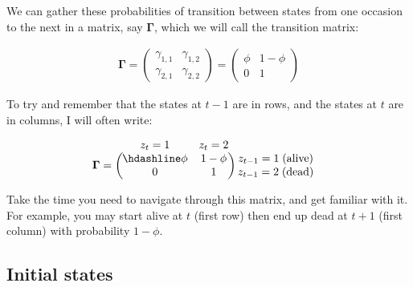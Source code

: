 \documentclass[
  12pt,
]{krantz}
\begin{document}
We can gather these probabilities of transition between states from one occasion to the next in a matrix, say \(\mathbf{\Gamma}\), which we will call the transition matrix:

\begin{align*}
\mathbf{\Gamma} =
\left(\begin{array}{cc}
\gamma_{1,1} & \gamma_{1,2}\\
\gamma_{2,1} & \gamma_{2,2}
\end{array}\right) =
\left(\begin{array}{cc}
\phi & 1 - \phi\\
0 & 1
\end{array}\right)
\end{align*}

To try and remember that the states at \(t-1\) are in rows, and the states at \(t\) are in columns, I will often write:

\[
\begin{matrix}
& \\
\mathbf{\Gamma} =
    \left ( \vphantom{ \begin{matrix} 12 \\ 12 \end{matrix} } \right .
\end{matrix}
\hspace{-1.2em}
\begin{matrix}
    z_t=1 & z_t=2 \\ \hdashline
\phi & 1-\phi \\
0 & 1
\end{matrix}
\hspace{-0.2em}
\begin{matrix}
& \\
\left . \vphantom{ \begin{matrix} 12 \\ 12 \end{matrix} } \right )
    \begin{matrix}
    z_{t-1}=1 \; \mbox{(alive)} \\ z_{t-1}=2 \; \mbox{(dead)}
    \end{matrix}
\end{matrix}
\]

Take the time you need to navigate through this matrix, and get familiar with it. For example, you may start alive at \(t\) (first row) then end up dead at \(t+1\) (first column) with probability \(1-\phi\).

\hypertarget{initial-states}{%
\subsection{Initial states}\label{initial-states}}
\end{document}
